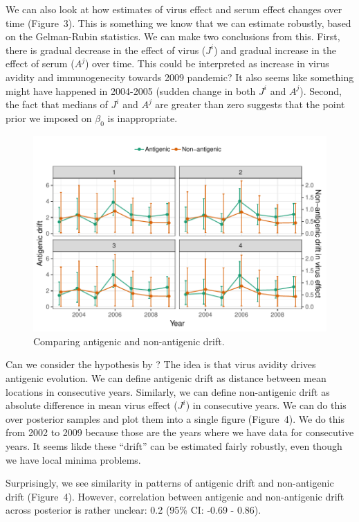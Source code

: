\documentclass[12pt]{article}
\begin{document}
We can also look at how estimates of virus effect and serum effect changes over time (Figure~3).
This is something we know that we can estimate robustly, based on the Gelman-Rubin statistics.
We can make two conclusions from this.
First, there is gradual decrease in the effect of virus ($J^i$) and gradual increase in the effect of serum ($A^j$) over time. This could be interpreted as increase in virus avidity and immunogenecity towards 2009 pandemic? 
It also seems like something might have happened in 2004-2005 (sudden change in both $J^i$ and $A^j$).
Second, the fact that medians of $J^i$ and $A^j$ are greater than zero suggests that the point prior we imposed on $\beta_0$ is inappropriate.

\begin{figure}
\includegraphics[width=\textwidth]{../figure/h1n1_drift.pdf}
\caption{Comparing antigenic and non-antigenic drift.}
\end{figure}

Can we consider the hypothesis by \citep{hensley2009hemagglutinin}?
The idea is that virus avidity drives antigenic evolution.
We can define antigenic drift as distance between mean locations in consecutive years.
Similarly, we can define non-antigenic drift as absolute difference in mean virus effect ($J^i$) in consecutive years.
We can do this over posterior samples and plot them into a single figure (Figure~4).
We do this from 2002 to 2009 because those are the years where we have data for consecutive years.
It seems likde these ``drift'' can be estimated fairly robustly, even though we have local minima problems.

Surprisingly, we see similarity in patterns of antigenic drift and non-antigenic drift (Figure~4).
However, correlation between antigenic and non-antigenic drift across posterior is rather unclear: 0.2 (95\% CI: -0.69 - 0.86).
\end{document}
